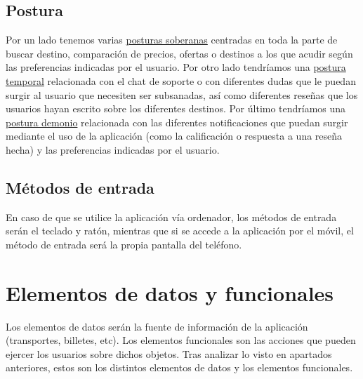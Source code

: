 \subsection{Postura}
Por un lado tenemos varias \underline{posturas soberanas} centradas en toda la
parte de buscar destino, comparación de precios, ofertas o destinos a los que
acudir según las preferencias indicadas por el usuario. Por otro lado
tendríamos una \underline{postura temporal} relacionada con el chat de soporte
o con diferentes dudas que le puedan surgir al usuario que necesiten ser
subsanadas, así como diferentes reseñas que los usuarios hayan escrito sobre
los diferentes destinos. Por último tendríamos una \underline{postura demonio}
relacionada con las diferentes notificaciones que puedan surgir mediante el uso
de la aplicación (como la calificación o respuesta a una reseña hecha) y las
preferencias indicadas por el usuario.

\subsection{Métodos de entrada}
En caso de que se utilice la aplicación vía ordenador, los métodos de entrada
serán el teclado y ratón, mientras que si se accede a la aplicación por el
móvil, el método de entrada será la propia pantalla del teléfono.

\section{Elementos de datos y funcionales}

Los elementos de datos serán la fuente de información de la aplicación
(transportes, billetes, etc). Los elementos funcionales son las acciones que
pueden ejercer los usuarios sobre dichos objetos. Tras analizar lo visto en
apartados anteriores, estos son los distintos elementos de datos y los
elementos funcionales.

